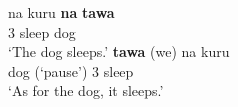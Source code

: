 \begin{exe}\ex\label{AjiEmph}
\begin{xlist}
\ex\gll na kuru \textbf{na} \textbf{tawa}\\
3\sg{} sleep \nom{} dog\\
\glt `The dog sleeps.'
\ex\gll \textbf{tawa} (we) na kuru\\
dog (`pause') 3\sg{} sleep\\
\glt `As for the dog, it sleeps.'
\end{xlist}
\end{exe} 







